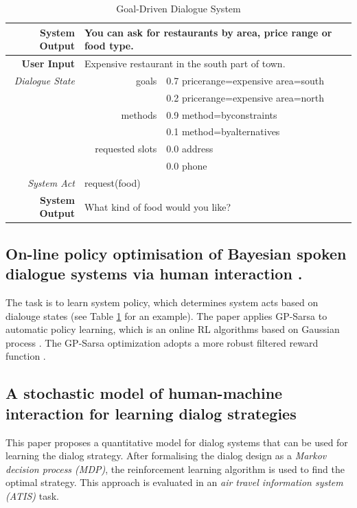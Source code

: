 \documentclass[paper=a4, fontsize=18pt]{article} %
\numberwithin{equation}{section} %
\numberwithin{figure}{section} %
\numberwithin{table}{section} %
\begin{document}
\begin{table}[!hbp]
\begin{tabular}{|r|rl|}
\hline
\textbf{System Output} & \multicolumn{2}{l|}{You can ask for restaurants by area, price range or food type.} \\
\hline
\textbf{User Input} & \multicolumn{2}{l|}{Expensive restaurant in the south part of town.} \\
\hline
\emph{Dialogue State} & goals
& 0.7 pricerange=expensive area=south \\
&& 0.2 pricerange=expensive area=north \\
& methods & 0.9 method=byconstraints \\
&& 0.1 method=byalternatives \\
& requested slots & 0.0 address \\
&& 0.0 phone \\
\hline
\emph{System Act} & \multicolumn{2}{l|}{request(food)} \\
\hline
\textbf{System Output} & \multicolumn{2}{l|}{What kind of food would you like?} \\
\hline
\end{tabular}
\caption{Goal-Driven Dialogue System} \label{Goal-Oriented Dialogue System Example}
\end{table}

\subsection{On-line policy optimisation of Bayesian spoken dialogue systems via human interaction \cite{Gasic2011}.}

The task is to learn system policy, which determines system acts based on dialouge states (see Table \ref{Goal-Oriented Dialogue System Example} for an example). The paper applies GP-Sarsa to automatic policy learning, which is an online RL algorithms based on Gaussian process \cite{Engel2014Reinforcement}. The GP-Sarsa optimization adopts a more robust filtered reward function \cite{Gašić2011Online}.

\subsection{A stochastic model of human-machine interaction for learning dialog strategies \cite{Levin2000A}}

This paper proposes a quantitative model for dialog systems that can be used for learning the dialog strategy. After formalising the dialog design as a \emph{Markov decision process (MDP)}, the reinforcement learning algorithm is used to find the optimal strategy. This approach is evaluated in an \emph{air travel information system (ATIS)} task.
\end{document}

